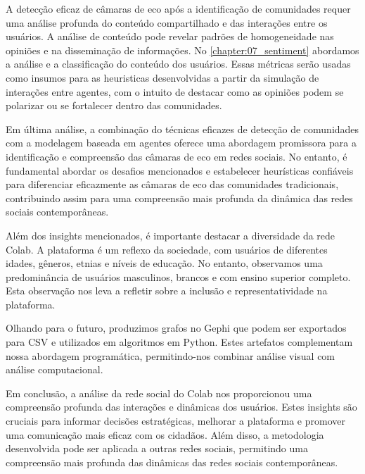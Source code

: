 A detecção eficaz de câmaras de eco após a identificação de comunidades requer uma análise profunda do conteúdo compartilhado e das interações entre os usuários. A análise de conteúdo pode revelar padrões de homogeneidade nas opiniões e na disseminação de informações. No \autoref{chapter:07_sentiment} abordamos a análise e a classificação do conteúdo dos usuários. Essas métricas serão usadas como insumos para as heuristicas desenvolvidas a partir da simulação de interações entre agentes, com o intuito de destacar como as opiniões podem se polarizar ou se fortalecer dentro das comunidades.

Em última análise, a combinação do técnicas eficazes de detecção de comunidades com a modelagem baseada em agentes oferece uma abordagem promissora para a identificação e compreensão das câmaras de eco em redes sociais. No entanto, é fundamental abordar os desafios mencionados e estabelecer heurísticas confiáveis para diferenciar eficazmente as câmaras de eco das comunidades tradicionais, contribuindo assim para uma compreensão mais profunda da dinâmica das redes sociais contemporâneas.

Além dos insights mencionados, é importante destacar a diversidade da rede Colab. A plataforma é um reflexo da sociedade, com usuários de diferentes idades, gêneros, etnias e níveis de educação. No entanto, observamos uma predominância de usuários masculinos, brancos e com ensino superior completo. Esta observação nos leva a refletir sobre a inclusão e representatividade na plataforma.

Olhando para o futuro, produzimos grafos no Gephi que podem ser exportados para CSV e utilizados em algoritmos em Python. Estes artefatos complementam nossa abordagem programática, permitindo-nos combinar análise visual com análise computacional.

Em conclusão, a análise da rede social do Colab nos proporcionou uma compreensão profunda das interações e dinâmicas dos usuários. Estes insights são cruciais para informar decisões estratégicas, melhorar a plataforma e promover uma comunicação mais eficaz com os cidadãos. Além disso, a metodologia desenvolvida pode ser aplicada a outras redes sociais, permitindo uma compreensão mais profunda das dinâmicas das redes sociais contemporâneas.